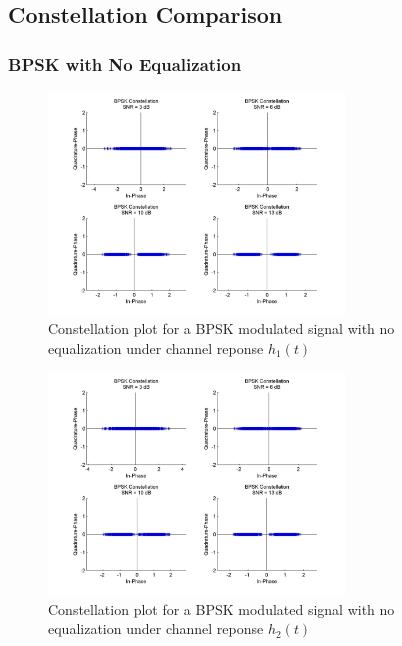 \documentclass[]{article}
\begin{document}
\newpage
\subsection{Constellation Comparison}
\label{sec:constCompare}

\subsubsection{BPSK with No Equalization}

\begin{figure}[H]
\centering
\includegraphics[width=0.7\textwidth]{bpConst1.jpg}
\caption{Constellation plot for a BPSK modulated signal with no equalization under channel reponse $h_1(t)$}
\end{figure}

\begin{figure}[H]
\centering
\includegraphics[width=0.7\textwidth]{bpConst2.jpg}
\caption{Constellation plot for a BPSK modulated signal with no equalization under channel reponse $h_2(t)$}
\end{figure}
\end{document}

